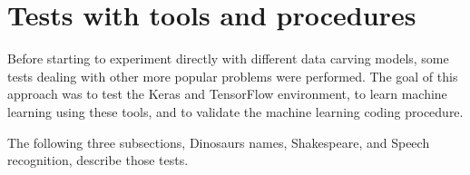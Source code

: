 \section{Tests with tools and procedures}
Before starting to experiment directly with different data carving models,
some tests dealing with other more popular problems were performed.
The goal of this approach was to test the Keras and TensorFlow environment, to learn machine learning using these tools, and to validate the machine learning coding procedure.

The following three subsections, Dinosaurs names, Shakespeare, and Speech recognition, describe those tests.



